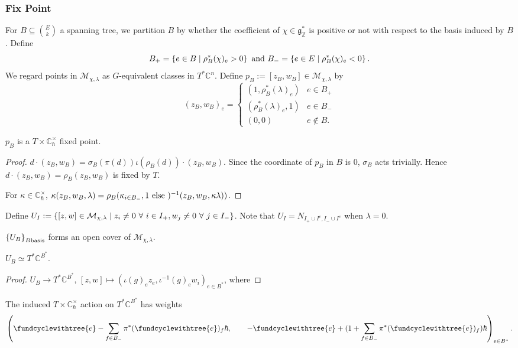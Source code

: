 \documentclass[b5paper]{article}
\newcommand{\MM}{\mathcal{M}}
\newcommand{\Chbar}{\mathbb{C}^\times _\hbar}
\begin{document}
\subsubsection{Fix Point}

For $B\subseteq \binom{E}{k}$ a spanning tree, we partition $B$ by whether the coefficient of $\chi\in \mathfrak{g}_\mathbb{Z}^*$ is positive or not with respect to the basis induced by $B$. Define 
\[
B_+=\left\{e\in B\mid \rho^*_B(\chi)_e>0\right\}
\textnormal{ and }
B_-=\left\{e\in E\mid \rho^*_B(\chi)_e<0\right\}.
\]
We regard points in $\MM_{\chi,\lambda}$ as $G$-equivalent classes in $T^*\mathbb{C}^n$. 
Define $p_B:=[z_B,w_B]\in \MM_{\chi,\lambda}$ by 
\[
  (z_B,w_B)_e=\begin{cases}
    (1,\rho_B^*(\lambda)_e) & e\in B_+\\
    (\rho_B^*(\lambda)_e,1) & e\in B_-\\
    (0,0) & e\notin  B.
  \end{cases}
\]
\begin{proposition}[pps:]{}
  $p_B$ is a $T\times\Chbar$ fixed point.
  \begin{proof}
    $d\cdot (z_B,w_B)=\sigma_B(\pi(d))\iota(\rho_B(d))\cdot (z_B,w_B)$. Since the coordinate of $p_B$ in $B$ is $0$, $\sigma_B$ acts trivially. Hence $d\cdot (z_B,w_B)=\rho_B(z_B,w_B)$ is fixed by $T$.

    For $\kappa\in \Chbar$, $\kappa(z_B,w_B,\lambda)=\rho_B(\kappa_{i\in B_-},1\textnormal{ else })^{-1}(z_B,w_B,\kappa\lambda))$.
  \end{proof}
\end{proposition}

Define $U_I:=\CB{[z,w]\in \MM_{\chi,\lambda}\mid z_i\neq 0\ \forall\ i\in I_+, w_j\neq 0\ \forall\ j\in I_-}$.
Note that $U_I=N_{I_+\cup I^c,I_-\cup I^c}$ when $\lambda=0$.

\begin{proposition}[pps:]{}
  $\left\{U_B\right\}_{B \textnormal{basis}}$ forms an open cover of $\MM_{\chi,\lambda}$.
\end{proposition}

\begin{proposition}[pps:]{}
  $U_B\simeq T^*\mathbb{C}^{B^*}$.
  \begin{proof}
    $U_B\rightarrow T^*\mathbb{C}^{B^*}$, $[z,w]\mapsto (\iota(g)_ez_e,\iota^{-1}(g)_ew_i)_{e\in B^*}$, where 
  \end{proof}
\end{proposition}

\begin{proposition}[pps:]{}
  The induced $T\times \Chbar$ action on $T^*\mathbb{C}^{B^*}$ has weights 
  \[
    \left(
      \fundcyclewithtree{e}-\sum_{f\in B_-}^{}\pi^*(\fundcyclewithtree{e})_f\hbar,\qquad 
    -\fundcyclewithtree{e}+(1+\sum_{f\in B_-}^{}\pi^*(\fundcyclewithtree{e})_f)\hbar
  \right)_{e\in B^*}.
  \]
\end{proposition}
\end{document}
